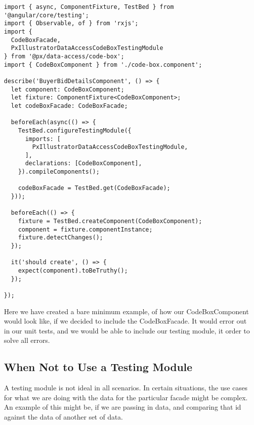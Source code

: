 \begin{lstlisting}
import { async, ComponentFixture, TestBed } from '@angular/core/testing';
import { Observable, of } from 'rxjs';
import {
  CodeBoxFacade,
  PxIllustratorDataAccessCodeBoxTestingModule
} from '@px/data-access/code-box';
import { CodeBoxComponent } from './code-box.component';

describe('BuyerBidDetailsComponent', () => {
  let component: CodeBoxComponent;
  let fixture: ComponentFixture<CodeBoxComponent>;
  let codeBoxFacade: CodeBoxFacade;

  beforeEach(async(() => {
    TestBed.configureTestingModule({
      imports: [
        PxIllustratorDataAccessCodeBoxTestingModule,
      ],
      declarations: [CodeBoxComponent],
    }).compileComponents();

    codeBoxFacade = TestBed.get(CodeBoxFacade);
  }));

  beforeEach(() => {
    fixture = TestBed.createComponent(CodeBoxComponent);
    component = fixture.componentInstance;
    fixture.detectChanges();
  });

  it('should create', () => {
    expect(component).toBeTruthy();
  });

});

\end{lstlisting}

Here we have created a bare minimum example, of how our CodeBoxComponent would
look like, if we decided to include the CodeBoxFacade. It would error out in
our unit tests, and we would be able to include our testing module, it order to
solve all errors.

\subsection{ When Not to Use a Testing Module }
A testing module is not ideal in all scenarios. In certain situations, the
use cases for what we are doing with the data for the particular facade might
be complex. An example of this might be, if we are passing in data, and
comparing that id against the data of another set of data.
